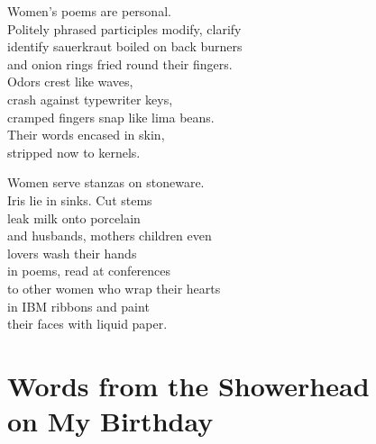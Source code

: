 \documentclass[twoside,10pt]{book}
\begin{document}
Women's poems are personal.\\
Politely phrased participles modify, clarify\\
identify sauerkraut boiled on back burners\\
and onion rings fried round their fingers.\\
Odors crest like waves,\\
crash against typewriter keys,\\
cramped fingers snap like lima beans.\\
Their words encased in skin,\\
stripped now to kernels.

Women serve stanzas on stoneware.\\
Iris lie in sinks. Cut stems\\
leak milk onto porcelain\\
and husbands, mothers children even\\
lovers wash their hands\\
in poems, read at conferences\\
to other women who wrap their hearts\\
in IBM ribbons and paint\\
their faces with liquid paper.


\clearpage
\section{Words from the Showerhead\\ on My Birthday}
\end{document}
